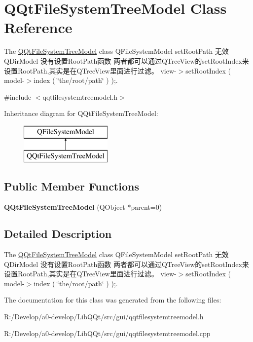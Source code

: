 \hypertarget{class_q_qt_file_system_tree_model}{}\section{Q\+Qt\+File\+System\+Tree\+Model Class Reference}
\label{class_q_qt_file_system_tree_model}


The \mbox{\hyperlink{class_q_qt_file_system_tree_model}{Q\+Qt\+File\+System\+Tree\+Model}} class Q\+File\+System\+Model set\+Root\+Path 无效 Q\+Dir\+Model 没有设置\+Root\+Path函数 两者都可以通过\+Q\+Tree\+View的set\+Root\+Index来设置\+Root\+Path,其实是在\+Q\+Tree\+View里面进行过滤。 view-\/$>$set\+Root\+Index ( model-\/$>$index ( \char`\"{}the/root/path\char`\"{} ) );.  




{\ttfamily \#include $<$qqtfilesystemtreemodel.\+h$>$}

Inheritance diagram for Q\+Qt\+File\+System\+Tree\+Model\+:\begin{figure}[H]
\begin{center}
\leavevmode
\includegraphics[height=2.000000cm]{class_q_qt_file_system_tree_model}
\end{center}
\end{figure}
\subsection*{Public Member Functions}
\begin{DoxyCompactItemize}
\item 
\mbox{\label{class_q_qt_file_system_tree_model_af425769b3f92cc66058ccd33d6179e29}} 
{\bfseries Q\+Qt\+File\+System\+Tree\+Model} (Q\+Object $\ast$parent=0)
\end{DoxyCompactItemize}


\subsection{Detailed Description}
The \mbox{\hyperlink{class_q_qt_file_system_tree_model}{Q\+Qt\+File\+System\+Tree\+Model}} class Q\+File\+System\+Model set\+Root\+Path 无效 Q\+Dir\+Model 没有设置\+Root\+Path函数 两者都可以通过\+Q\+Tree\+View的set\+Root\+Index来设置\+Root\+Path,其实是在\+Q\+Tree\+View里面进行过滤。 view-\/$>$set\+Root\+Index ( model-\/$>$index ( \char`\"{}the/root/path\char`\"{} ) );. 

The documentation for this class was generated from the following files\+:\begin{DoxyCompactItemize}
\item 
R\+:/\+Develop/a0-\/develop/\+Lib\+Q\+Qt/src/gui/qqtfilesystemtreemodel.\+h\item 
R\+:/\+Develop/a0-\/develop/\+Lib\+Q\+Qt/src/gui/qqtfilesystemtreemodel.\+cpp\end{DoxyCompactItemize}
